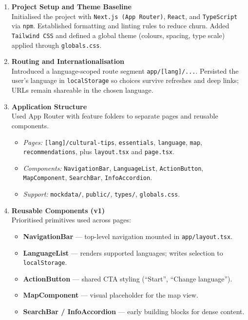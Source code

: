 \begin{enumerate}
    \item \textbf{Project Setup and Theme Baseline} \\
    Initialised the project with \texttt{Next.js (App Router)}, \texttt{React}, and \texttt{TypeScript} via \texttt{npm}. Established formatting and linting rules to reduce churn. Added \texttt{Tailwind CSS} and defined a global theme (colours, spacing, type scale) applied through \texttt{globals.css}.

    \item \textbf{Routing and Internationalisation} \\
    Introduced a language-scoped route segment \verb|app/[lang]/...|. Persisted the user’s language in \texttt{localStorage} so choices survive refreshes and deep links; URLs remain shareable in the chosen language.

    \item \textbf{Application Structure} \\
    Used App Router with feature folders to separate pages and reusable components.
    \begin{itemize}
        \item \textit{Pages:} \verb|[lang]/cultural-tips|, \verb|essentials|, \verb|language|, \verb|map|, \verb|recommendations|, plus \verb|layout.tsx| and \verb|page.tsx|.
        \item \textit{Components:} \texttt{NavigationBar}, \texttt{LanguageList}, \texttt{ActionButton}, \texttt{MapComponent}, \texttt{SearchBar}, \texttt{InfoAccordion}.
        \item \textit{Support:} \texttt{mockdata/}, \texttt{public/}, \texttt{types/}, \texttt{globals.css}.
    \end{itemize}

    \item \textbf{Reusable Components (v1)} \\
    Prioritised primitives used across pages:
    \begin{itemize}
        \item \textbf{NavigationBar} — top-level navigation mounted in \verb|app/layout.tsx|.
        \item \textbf{LanguageList} — renders supported languages; writes selection to \texttt{localStorage}.
        \item \textbf{ActionButton} — shared CTA styling (``Start'', ``Change language'').
        \item \textbf{MapComponent} — visual placeholder for the map view.
        \item \textbf{SearchBar / InfoAccordion} — early building blocks for dense content.
    \end{itemize}


\end{enumerate}
